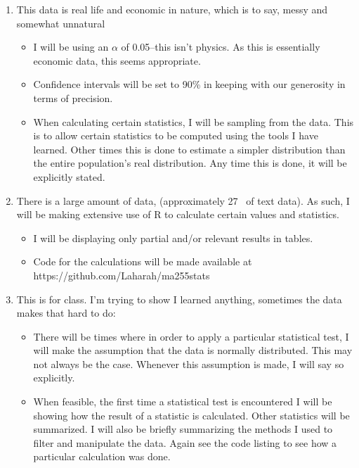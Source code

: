\documentclass[letterpaper]{article}
\theoremstyle{definition}
\begin{document}
\begin{enumerate} \item This data is real life and economic in nature, which is to say, messy
	and somewhat unnatural

  \begin{itemize}
  \item
    I will be using an $\alpha$ of 0.05–this isn't physics. As this is essentially
	economic data, this seems appropriate.
  \item
	  Confidence intervals will be set to 90\% in keeping with our generosity in terms of
	  precision.
\item
	When calculating certain statistics, I will be sampling from the data. This is to
	allow certain statistics to be computed using the tools I have learned. Other times
	this is done to estimate a simpler distribution than the entire population's real
	distribution. Any time this is done, it will be explicitly stated.
  \end{itemize}
\item
	There is a large amount of data, (approximately 27\unit{\mega\byte} of text data). As
	such, I will be making extensive use of R to calculate certain values and statistics.

  \begin{itemize}
	\item
		I will be displaying only partial and/or relevant results in tables.
	\item
		Code for the calculations will be made available at https://github.com/Laharah/ma255stats

  \end{itemize}
\item
  This is for class. I'm trying to show I learned anything, sometimes
  the data makes that hard to do:

  \begin{itemize}
  \item
	  There will be times where in order to apply a particular statistical test, I will
	  make the assumption that the data is normally distributed. This may not always be
	  the case. Whenever this assumption is made, I will say so explicitly.
	\item
		When feasible, the first time a statistical test is encountered I will be showing
		how the result of a statistic is calculated. Other statistics will be summarized.
		I will also be briefly summarizing the methods I used to filter and manipulate the
		data. Again see the code listing to see how a particular calculation was done.
  \end{itemize}
\end{enumerate}
\end{document}
